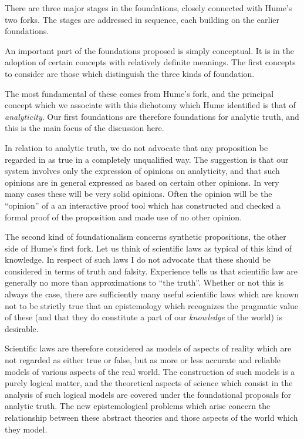 There are three major stages in the foundations, closely connected
with Hume's two forks.
The stages are addressed in sequence, each building on the earlier
foundations.

An important part of the foundations proposed is simply conceptual.
It is in the adoption of certain concepts with relatively definite
meanings.
The first concepts to consider are those which distinguish the three
kinds of foundation.

The most fundamental of these comes from Hume's fork, and the
principal concept which we associate with this dichotomy which Hume
identified is that of {\it analyticity}.
Our first foundations are therefore foundations for analytic truth,
and this is the main focus of the discussion here.

In relation to analytic truth, we do not advocate that any proposition
be regarded in as true in a completely unqualified way.
The suggestion is that our system involves only the expression of
opinions on analyticity, and that such opinions are in general
expressed as based on certain other opinions.
In very many cases these will be very solid opinions.
Often the opinion will be the ``opinion'' of a an interactive proof
tool which has constructed and checked a formal proof of the
proposition and made use of no other opinion.

The second kind of foundationalism concerns synthetic propositions,
the other side of Hume's first fork.
Let us think of scientific laws as typical of this kind of knowledge.
In respect of such laws I do not advocate that these should be
considered in terms of truth and falsity.
Experience tells us that scientific law are generally no more than
approximations to ``the truth''.
Whether or not this is always the case, there are sufficiently many
useful scientific laws which are known not to be strictly true that an
epistemology which recognizes the pragmatic value of these
(and that they do constitute a part of our {\it knowledge} of the world)
is desirable.

Scientific laws are therefore considered as models of aspects of
reality which are not regarded as either true or false, but as more or
less accurate and reliable models of various aspects of the real world.
The construction of such models is a purely logical matter, and the
theoretical aspects of science which consist in the analysis of such
logical models are covered under the foundational proposals for
analytic truth.
The new epistemological problems which arise concern the relationship
between these abstract theories and those aspects of the world which
they model.

